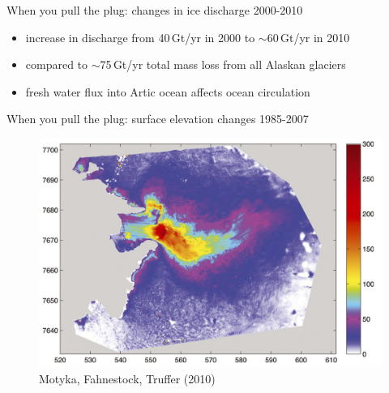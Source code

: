 \documentclass[hide notes,intlimits]{beamer}
\begin{document}
\begin{frame}{When you pull the plug: changes in ice discharge 2000-2010}
  \begin{itemize}
  \item increase in discharge from 40\,Gt/yr in 2000 to $\sim$60\,Gt/yr in 2010
  \item compared to $\sim$75\,Gt/yr total mass loss from all Alaskan glaciers
  \item fresh water flux into Artic ocean affects ocean circulation
  \end{itemize}
\end{frame}


{
%
} 

\begin{frame}{When you pull the plug: surface elevation changes 1985-2007}

  \begin{figure}
    \includegraphics[width=.8\textwidth]{jib-obs-surface-diff-motyka} \\
    \footnotesize{Motyka, Fahnestock, Truffer (2010)}
  \end{figure}
\end{frame}
\end{document}
